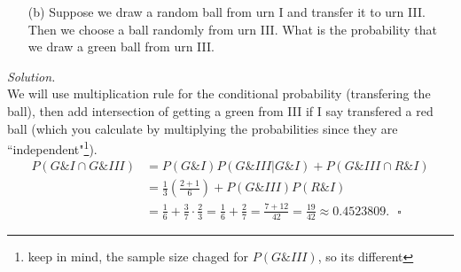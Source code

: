 \documentclass[12pt]{report}
\begin{document}
\begin{itemize}
\item [(b)] Suppose we draw a random ball from urn I and transfer it to urn III. Then we choose a ball randomly from urn III. What is the probability that we draw a green ball from urn III.
\end{itemize}
\textit{Solution. }\\
We will use multiplication rule for the conditional probability (transfering the ball), then add intersection of getting a green from III if I say transfered a red ball (which you calculate by multiplying the probabilities since they are ``independent"\footnote{keep in mind, the sample size chaged for $P(G\&III)$, so its different}).
\begin{align*}
P(G\&I\cap G\&III)&=P(G\&I)P(G\&III|G\&I)+P(G\&III\cap R\&I)\\
&=\frac{1}{3}\left(\frac{2+1}{6}\right) + P(G\&III)P(R\&I)\\
&=\frac{1}{6} + \frac{3}{7}\cdot\frac{2}{3}=\frac{1}{6}+\frac{2}{7}=\frac{7+12}{42}=\frac{19}{42}\approx0.4523809.~~~\square
\end{align*}

\pagebreak
\end{document}
